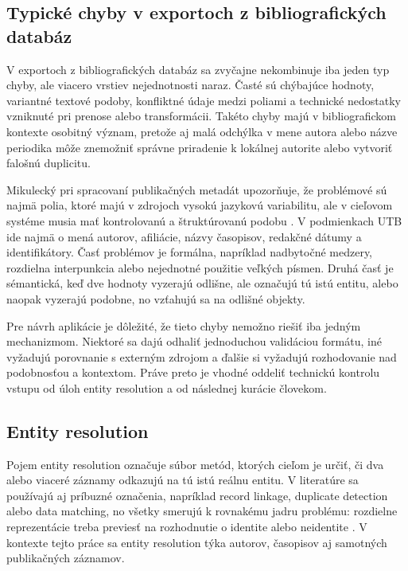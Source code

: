 \subsection{Typické chyby v exportoch z bibliografických databáz}

V exportoch z bibliografických databáz sa zvyčajne nekombinuje iba jeden typ chyby, ale viacero vrstiev nejednotnosti naraz. Časté sú chýbajúce hodnoty, variantné textové podoby, konfliktné údaje medzi poliami a technické nedostatky vzniknuté pri prenose alebo transformácii. Takéto chyby majú v bibliografickom kontexte osobitný význam, pretože aj malá odchýlka v mene autora alebo názve periodika môže znemožniť správne priradenie k lokálnej autorite alebo vytvoriť falošnú duplicitu.

Mikulecký pri spracovaní publikačných metadát upozorňuje, že problémové sú najmä polia, ktoré majú v zdrojoch vysokú jazykovú variabilitu, ale v cieľovom systéme musia mať kontrolovanú a štruktúrovanú podobu \cite{Mikulecky2025}. V podmienkach UTB ide najmä o mená autorov, afiliácie, názvy časopisov, redakčné dátumy a identifikátory. Časť problémov je formálna, napríklad nadbytočné medzery, rozdielna interpunkcia alebo nejednotné použitie veľkých písmen. Druhá časť je sémantická, keď dve hodnoty vyzerajú odlišne, ale označujú tú istú entitu, alebo naopak vyzerajú podobne, no vzťahujú sa na odlišné objekty.

Pre návrh aplikácie je dôležité, že tieto chyby nemožno riešiť iba jedným mechanizmom. Niektoré sa dajú odhaliť jednoduchou validáciou formátu, iné vyžadujú porovnanie s externým zdrojom a ďalšie si vyžadujú rozhodovanie nad podobnosťou a kontextom. Práve preto je vhodné oddeliť technickú kontrolu vstupu od úloh entity resolution a od následnej kurácie človekom.

\subsection{Entity resolution}

Pojem entity resolution označuje súbor metód, ktorých cieľom je určiť, či dva alebo viaceré záznamy odkazujú na tú istú reálnu entitu. V literatúre sa používajú aj príbuzné označenia, napríklad record linkage, duplicate detection alebo data matching, no všetky smerujú k rovnakému jadru problému: rozdielne reprezentácie treba previesť na rozhodnutie o identite alebo neidentite \cite{Christen2012,KopckeRahm2010}. V kontexte tejto práce sa entity resolution týka autorov, časopisov aj samotných publikačných záznamov.

